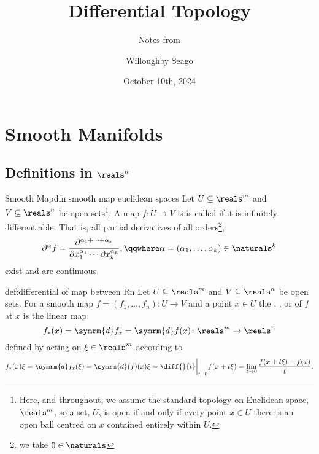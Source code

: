\documentclass[fleqn]{NotesClass}
\title{Differential Topology}
\author{Willoughby Seago}
\date{October 10th, 2024}
\subtitle{Notes from}
\renewcommand{\dl}{\symrm{d}}
\begin{document}
    \frontmatter
    \titlepage
    \innertitlepage{}
    \tableofcontents
    \mainmatter
    
    \chapter{Smooth Manifolds}
    \section{Definitions in \texorpdfstring{\(\reals^n\)}{Rn}}
    \begin{dfn}{Smooth Map}{dfn:smooth map euclidean spaces}
        Let \(U \subseteq \reals^m\) and \(V \subseteq \reals^n\) be open sets\footnote{Here, and throughout, we assume the standard topology on Euclidean space, \(\reals^m\), so a set, \(U\), is open if and only if every point \(x \in U\) there is an open ball centred on \(x\) contained entirely within \(U\).}.
        A map \(f \colon U \to V\) is  is called  if it is infinitely differentiable.
        That is, all partial derivatives of all orders\footnote{we take \(0 \in \naturals\)},
        \begin{equation}
            \partial^\alpha f = \frac{\partial^{\alpha_1 + \dotsb + \alpha_k}}{\partial x_1^{\alpha_1} \dotsm \partial x_k^{\alpha_k}}, \qqwhere \alpha = (\alpha_1, \dotsc, \alpha_k) \in \naturals^{k}
        \end{equation}
        exist and are continuous.
    \end{dfn}
    
    \begin{dfn}{}{def:differential of map between Rn}
        Let \(U \subseteq \reals^m\) and \(V \subseteq \reals^n\) be open sets.
        For a smooth map \(f = (f_1, \dotsc, f_n) \colon U \to V\) and a point \(x \in U\) the , , or  of \(f\) at \(x\) is the linear map
        \begin{equation}
            f_*(x) = \dl f_x = \dl f(x) \colon \reals^m \to \reals^n
        \end{equation}
        defined by acting on \(\xi \in \reals^m\) according to
        \begin{equation}
            f_*(x)\xi = \dl f_x(\xi) = \dl(f)(x)\xi = \diff{}{t}\bigg|_{t = 0} f(x + t\xi) = \lim_{t \to 0} \frac{f(x + t\xi) - f(x)}{t}.
        \end{equation}
    \end{dfn}
    
\end{document}
